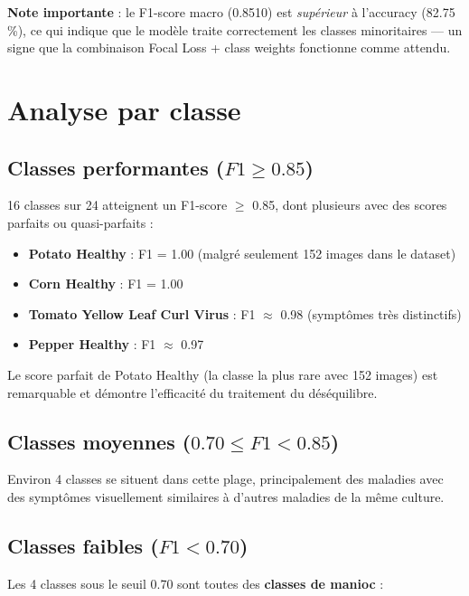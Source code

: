 \documentclass[12pt, a4paper, twoside]{report}
\begin{document}
\textbf{Note importante} : le F1-score macro (0.8510) est \textit{supérieur} à l'accuracy (82.75\,\%), ce qui indique que le modèle traite correctement les classes minoritaires — un signe que la combinaison Focal Loss + class weights fonctionne comme attendu.

\section{Analyse par classe}

\subsection{Classes performantes ($F1 \geq 0.85$)}

16 classes sur 24 atteignent un F1-score $\geq$ 0.85, dont plusieurs avec des scores parfaits ou quasi-parfaits :

\begin{itemize}
    \item \textbf{Potato Healthy} : F1 = 1.00 (malgré seulement 152 images dans le dataset)
    \item \textbf{Corn Healthy} : F1 = 1.00
    \item \textbf{Tomato Yellow Leaf Curl Virus} : F1 $\approx$ 0.98 (symptômes très distinctifs)
    \item \textbf{Pepper Healthy} : F1 $\approx$ 0.97
\end{itemize}

Le score parfait de Potato Healthy (la classe la plus rare avec 152 images) est remarquable et démontre l'efficacité du traitement du déséquilibre.

\subsection{Classes moyennes ($0.70 \leq F1 < 0.85$)}

Environ 4 classes se situent dans cette plage, principalement des maladies avec des symptômes visuellement similaires à d'autres maladies de la même culture.

\subsection{Classes faibles ($F1 < 0.70$)}

Les 4 classes sous le seuil 0.70 sont toutes des \textbf{classes de manioc} :
\end{document}
